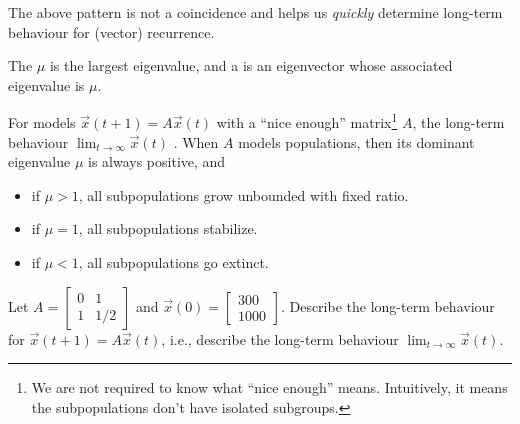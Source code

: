 \documentclass[../main.tex]{subfiles}
\begin{document}


The above pattern is not a coincidence and helps us  \emph{quickly} determine long-term behaviour for (vector) recurrence.

\begin{method} \label{method:dominant-eigenvalue}
  The  \(\mu\) is the largest eigenvalue, and a  is an eigenvector whose associated eigenvalue is \(\mu\).

  For models \(\vec{x}(t+1) = A \vec{x}(t)\) with a ``nice enough'' matrix\footnote{We are not required to know what ``nice enough'' means. Intuitively, it means the subpopulations don't have isolated subgroups.} \(A\), the long-term behaviour \(\lim_{t \to \infty} \vec{x}(t)\) . When \(A\) models populations, then its dominant eigenvalue \(\mu\) is always positive, and 
  \begin{itemize}
    \item if \(\mu > 1\), all subpopulations grow unbounded with fixed ratio.
    \item if \(\mu = 1\), all subpopulations stabilize.
    \item if \(\mu < 1\), all subpopulations go extinct.
  \end{itemize}
\end{method}

\blanks*
\clearpage

\begin{example} \label{ex:perron-long-term}
  Let \(A = \begin{bmatrix} 0 & 1 \\ 1 & 1/2 \end{bmatrix}\) and \(\vec{x}(0) = \begin{bmatrix} 300 \\ 1000\end{bmatrix}\).  Describe the long-term behaviour for \(\vec{x}(t + 1) = A \vec{x}(t)\), i.e., describe the long-term behaviour \(\lim_{t \to \infty} \vec{x}(t)\). 

  \blanks*
\end{example}
\clearpage
\end{document}
